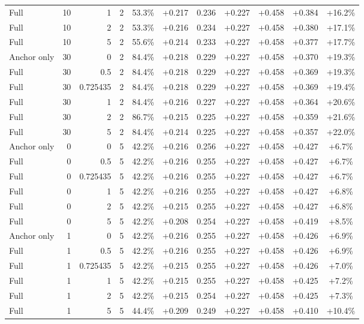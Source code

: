 \begin{table}[htbp]
\begin{tabular}{lrrrccccccc}
Full & 10 & 1 & 2 & 53.3\% & +0.217 & 0.236 & +0.227 & +0.458 & +0.384 & +16.2\% \\
Full & 10 & 2 & 2 & 53.3\% & +0.216 & 0.234 & +0.227 & +0.458 & +0.380 & +17.1\% \\
Full & 10 & 5 & 2 & 55.6\% & +0.214 & 0.233 & +0.227 & +0.458 & +0.377 & +17.7\% \\
Anchor only & 30 & 0 & 2 & 84.4\% & +0.218 & 0.229 & +0.227 & +0.458 & +0.370 & +19.3\% \\
Full & 30 & 0.5 & 2 & 84.4\% & +0.218 & 0.229 & +0.227 & +0.458 & +0.369 & +19.3\% \\
Full & 30 & 0.725435 & 2 & 84.4\% & +0.218 & 0.229 & +0.227 & +0.458 & +0.369 & +19.4\% \\
Full & 30 & 1 & 2 & 84.4\% & +0.216 & 0.227 & +0.227 & +0.458 & +0.364 & +20.6\% \\
Full & 30 & 2 & 2 & 86.7\% & +0.215 & 0.225 & +0.227 & +0.458 & +0.359 & +21.6\% \\
Full & 30 & 5 & 2 & 84.4\% & +0.214 & 0.225 & +0.227 & +0.458 & +0.357 & +22.0\% \\
Anchor only & 0 & 0 & 5 & 42.2\% & +0.216 & 0.256 & +0.227 & +0.458 & +0.427 & +6.7\% \\
Full & 0 & 0.5 & 5 & 42.2\% & +0.216 & 0.255 & +0.227 & +0.458 & +0.427 & +6.7\% \\
Full & 0 & 0.725435 & 5 & 42.2\% & +0.216 & 0.255 & +0.227 & +0.458 & +0.427 & +6.7\% \\
Full & 0 & 1 & 5 & 42.2\% & +0.216 & 0.255 & +0.227 & +0.458 & +0.427 & +6.8\% \\
Full & 0 & 2 & 5 & 42.2\% & +0.215 & 0.255 & +0.227 & +0.458 & +0.427 & +6.8\% \\
Full & 0 & 5 & 5 & 42.2\% & +0.208 & 0.254 & +0.227 & +0.458 & +0.419 & +8.5\% \\
Anchor only & 1 & 0 & 5 & 42.2\% & +0.216 & 0.255 & +0.227 & +0.458 & +0.426 & +6.9\% \\
Full & 1 & 0.5 & 5 & 42.2\% & +0.216 & 0.255 & +0.227 & +0.458 & +0.426 & +6.9\% \\
Full & 1 & 0.725435 & 5 & 42.2\% & +0.215 & 0.255 & +0.227 & +0.458 & +0.426 & +7.0\% \\
Full & 1 & 1 & 5 & 42.2\% & +0.215 & 0.255 & +0.227 & +0.458 & +0.425 & +7.2\% \\
Full & 1 & 2 & 5 & 42.2\% & +0.215 & 0.254 & +0.227 & +0.458 & +0.425 & +7.3\% \\
Full & 1 & 5 & 5 & 44.4\% & +0.209 & 0.249 & +0.227 & +0.458 & +0.410 & +10.4\% \\

\end{tabular}
\end{table}
